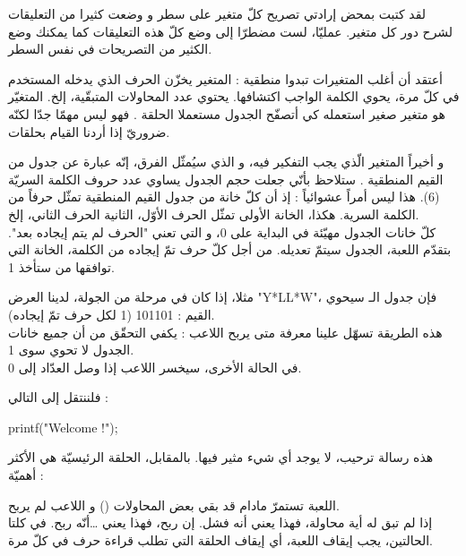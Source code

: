 لقد كتبت بمحض إرادتي تصريح كلّ متغير على سطر و وضعت كثيرا من التعليقات لشرح دور كل متغير. عمليّا، لست مضطرّا إلى وضع كلّ هذه التعليقات كما يمكنك وضع الكثير من التصريحات في نفس السطر.

أعتقد أن أغلب المتغيرات تبدوا منطقية : المتغير
يخزّن الحرف الذي يدخله المستخدم في كلّ مرة،
يحوي الكلمة الواجب اكتشافها.
يحتوي عدد المحاولات المتبقّية، إلخ. المتغيّر
هو متغير صغير استعمله كي أتصفّح الجدول مستعملا الحلقة
.
فهو ليس مهمّا جدّا لكنّه ضروريّ إذا أردنا القيام بحلقات.

و أخيراً المتغير الّذي يجب التفكير فيه، و الذي سيُمثّل الفرق، إنّه عبارة عن جدول من القيم المنطقية
.
ستلاحظ بأنّي جعلت حجم الجدول يساوي عدد حروف الكلمة السريّة (6). هذا ليس أمراً عشوائياً : إذ أن كلّ خانة من جدول القيم المنطقية  تمثّل حرفاً من الكلمة السرية. هكذا، الخانة الأولى تمثّل الحرف الأوّل، الثانية الحرف الثاني، إلخ.\\
كلّ خانات الجدول مهيّئة في البداية على 0، و التي تعني "الحرف لم يتم إيجاده بعد". بتقدّم اللعبة، الجدول سيتمّ تعديله. من أجل كلّ حرف تمّ إيجاده من الكلمة، الخانة التي توافقها من
ستأخذ 1.

مثلا، إذا كان في مرحلة من الجولة، لدينا العرض
"\textenglish{Y*LL*W}"،
فإن جدول الـ
سيحوي القيم : 101101 (1 لكل حرف تمّ إيجاده).\\
هذه الطريقة تسهّل علينا معرفة متى يربح اللاعب : يكفي التحقّق من أن جميع خانات الجدول لا تحوي سوى 1.\\
في الحالة الأخرى، سيخسر اللاعب إذا وصل العدّاد
إلى 0.

فلننتقل إلى التالي :

\begin{Csource}
printf("Welcome !\n\n");
\end{Csource}

هذه رسالة ترحيب، لا يوجد أي شيء مثير فيها. بالمقابل، الحلقة الرئيسيّة هي  الأكثر أهميّة :

\begin{Csource}
while (remainingTries  > 0 && !win(foundLetter))
{
\end{Csource}

اللعبة تستمرّ مادام قد بقي بعض المحاولات
()
و اللاعب لم يربح.\\
إذا لم تبق له أية محاولة، فهذا يعني أنه فشل. إن ربح، فهذا يعني \dots أنّه ربح. في كلتا الحالتين، يجب إيقاف اللعبة، أي إيقاف الحلقة التي تطلب قراءة حرف في كلّ مرة.

